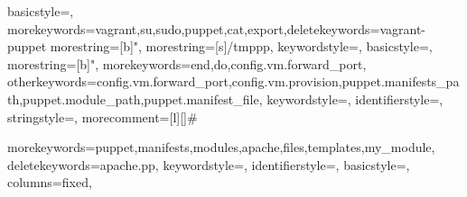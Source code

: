 \usepackage{listings}


{
basicstyle=\ttfamily\scriptsize,
morekeywords={vagrant,su,sudo,puppet,cat,export},deletekeywords={vagrant-puppet}
morestring=[b]",
morestring={[s]{/tmp}{pp}},
keywordstyle=\color{cyan},
}
{
basicstyle=\ttfamily\scriptsize,
morestring=[b]",
morekeywords={end,do,config.vm.forward_port},
otherkeywords={config.vm.forward_port,config.vm.provision,puppet.manifests_path,puppet.module_path,puppet.manifest_file},
keywordstyle=\color{cyan},
identifierstyle=\color{darkblue},
stringstyle=\color{black},
morecomment=[l][\color{black}]{\#}
}

{
morekeywords={puppet,manifests,modules,apache,files,templates,my_module},
deletekeywords={apache.pp},
keywordstyle=\color{cyan},
identifierstyle=\color{darkblue},
basicstyle=\ttfamily\scriptsize,
columns=fixed,
}

